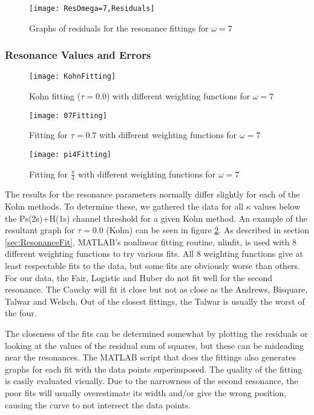 \documentclass[Dissertation.tex]{subfiles}
\begin{document}
\begin{figure}[H]
	\centering
	\texttt{[image: ResOmega=7,Residuals]}
	\caption{Graphs of residuals for the resonance fittings for $\omega = 7$}
	\label{fig:ResOmega=7,Residuals}
\end{figure}



\subsubsection{Resonance Values and Errors}
\label{sec:ResonanceErrors}

\begin{figure}[H]
	\centering
	\texttt{[image: KohnFitting]}
	\caption{Kohn fitting ($\tau = 0.0$) with different weighting functions for $\omega = 7$}
	\label{fig:KohnFitting}
\end{figure}

\begin{figure}[H]
	\centering
	\texttt{[image: 07Fitting]}
	\caption{Fitting for $\tau = 0.7$ with different weighting functions for $\omega = 7$}
	\label{fig:07Fitting}
\end{figure}

\begin{figure}[H]
	\centering
	\texttt{[image: pi4Fitting]}
	\caption{Fitting for $\frac{\pi}{4}$ with different weighting functions for $\omega = 7$}
	\label{fig:pi4Fitting}
\end{figure}

The results for the resonance parameters normally differ slightly for each of the Kohn methods.  To determine these, we gathered the data for all $\kappa$ values below the Ps(2s)+H(1s) channel threshold for a given Kohn method.  An example of the resultant graph for $\tau = 0.0$ (Kohn) can be seen in figure \ref{fig:KohnFitting}.  As described in section \ref{sec:ResonanceFit}, MATLAB's nonlinear fitting routine, nlinfit, is used with 8 different weighting functions to try various fits.  All 8 weighting functions give at least respectable fits to the data, but some fits are obviously worse than others.  For our data, the Fair, Logistic and Huber do not fit well for the second resonance.  The Cauchy will fit it close but not as close as the Andrews, Bisquare, Talwar and Welsch.  Out of the closest fittings, the Talwar is usually the worst of the four.

The closeness of the fits can be determined somewhat by plotting the residuals or looking at the values of the residual sum of squares, but these can be misleading near the resonances.  The MATLAB script that does the fittings also generates graphs for each fit with the data points superimposed.  The quality of the fitting is easily evaluated visually.  Due to the narrowness of the second resonance, the poor fits will usually overestimate its width and/or give the wrong position, causing the curve to not intersect the data points.
\end{document}
